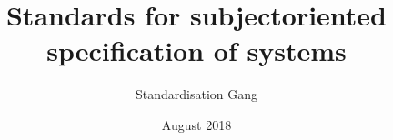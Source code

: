 \documentclass[a4paper,12pt]{book}
\begin{document}
	
	\author{Standardisation Gang}
	\title{Standards for subjectoriented specification of systems}
	\date{August 2018}
	
	\frontmatter
	\maketitle
	\tableofcontents
	
	\mainmatter
	
	
	
	
	
	
\end{document}
